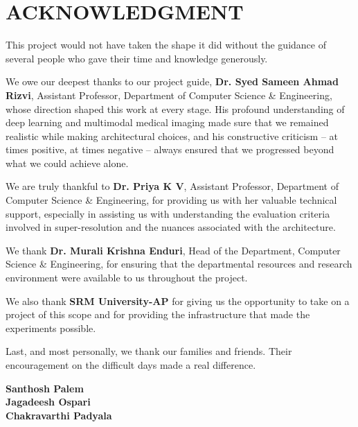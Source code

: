 \chapter*{ACKNOWLEDGMENT}

This project would not have taken the shape it did without the guidance of several people who gave their time and knowledge generously.

We owe our deepest thanks to our project guide, \textbf{Dr. Syed Sameen Ahmad Rizvi}, Assistant Professor, Department of Computer Science \& Engineering, whose direction shaped this work at every stage. His profound understanding of deep learning and multimodal medical imaging made sure that we remained realistic while making architectural choices, and his constructive criticism – at times positive, at times negative – always ensured that we progressed beyond what we could achieve alone.

We are truly thankful to \textbf{Dr. Priya K V}, Assistant Professor, Department of Computer Science \& Engineering, for providing us with her valuable technical support, especially in assisting us with understanding the evaluation criteria involved in super-resolution and the nuances associated with the architecture.

We thank \textbf{Dr. Murali Krishna Enduri}, Head of the Department, Computer Science \& Engineering, for ensuring that the departmental resources and research environment were available to us throughout the project.

We also thank \textbf{SRM University-AP} for giving us the opportunity to take on a project of this scope and for providing the infrastructure that made the experiments possible.

Last, and most personally, we thank our families and friends. Their encouragement on the difficult days made a real difference.

\vspace{1.5cm}
\begin{flushright}
\textbf{Santhosh Palem}\\
\textbf{Jagadeesh Ospari}\\
\textbf{Chakravarthi Padyala}
\end{flushright}